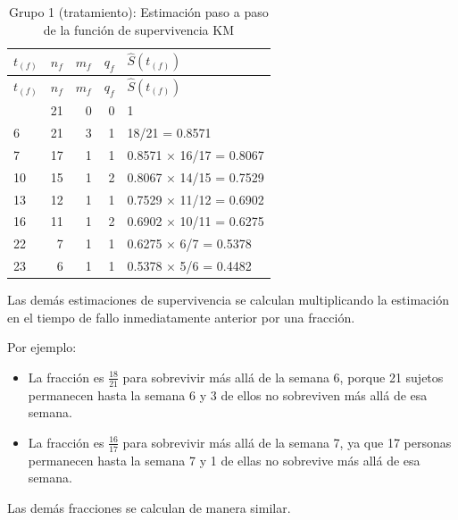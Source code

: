 \documentclass[
]{article}
\providecommand{\tightlist}{%
  \setlength{\itemsep}{0pt}\setlength{\parskip}{0pt}}
\begin{document}
\begin{longtable}[]{@{}lrrrl@{}}
\caption{Grupo 1 (tratamiento): Estimación paso a paso de la función de
supervivencia KM}\tabularnewline
\toprule\noalign{}
\(t_{(f)}\) & \(n_f\) & \(m_f\) & \(q_f\) & \(\hat{S}(t_{(f)})\) \\
\midrule\noalign{}
\endfirsthead
\toprule\noalign{}
\(t_{(f)}\) & \(n_f\) & \(m_f\) & \(q_f\) & \(\hat{S}(t_{(f)})\) \\
\midrule\noalign{}
\endhead
\bottomrule\noalign{}
\endlastfoot
0 & 21 & 0 & 0 & 1 \\
6 & 21 & 3 & 1 & 18/21 = 0.8571 \\
7 & 17 & 1 & 1 & 0.8571 × 16/17 = 0.8067 \\
10 & 15 & 1 & 2 & 0.8067 × 14/15 = 0.7529 \\
13 & 12 & 1 & 1 & 0.7529 × 11/12 = 0.6902 \\
16 & 11 & 1 & 2 & 0.6902 × 10/11 = 0.6275 \\
22 & 7 & 1 & 1 & 0.6275 × 6/7 = 0.5378 \\
23 & 6 & 1 & 1 & 0.5378 × 5/6 = 0.4482 \\
\end{longtable}

\begin{tcolorbox}[enhanced jigsaw, colbacktitle=quarto-callout-note-color!10!white, coltitle=black, rightrule=.15mm, title=\textcolor{quarto-callout-note-color}{\faInfo}\hspace{0.5em}{Cálculo de otras estimaciones de supervivencia}, arc=.35mm, breakable, bottomtitle=1mm, toprule=.15mm, titlerule=0mm, opacitybacktitle=0.6, bottomrule=.15mm, toptitle=1mm, colback=white, left=2mm, opacityback=0, leftrule=.75mm, colframe=quarto-callout-note-color-frame]

Las demás estimaciones de supervivencia se calculan multiplicando la
estimación en el tiempo de fallo inmediatamente anterior por una
fracción.

Por ejemplo:

\begin{itemize}
\tightlist
\item
  La fracción es \(\frac{18}{21}\) para sobrevivir más allá de la semana
  6, porque 21 sujetos permanecen hasta la semana 6 y 3 de ellos no
  sobreviven más allá de esa semana.
\item
  La fracción es \(\frac{16}{17}\) para sobrevivir más allá de la semana
  7, ya que 17 personas permanecen hasta la semana 7 y 1 de ellas no
  sobrevive más allá de esa semana.
\end{itemize}

Las demás fracciones se calculan de manera similar.

\end{tcolorbox}
\end{document}
